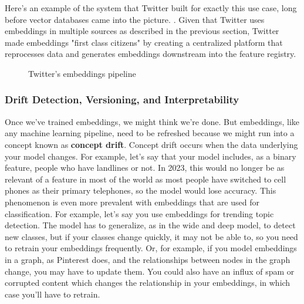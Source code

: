 \documentclass[11pt, table]{diazessay} %
\begin{document}
\begin{sloppypar}
Here's an example of the system that Twitter built for exactly this use case, long before vector databases came into the picture. \citep{shiebler2010making}. Given that Twitter uses embeddings in multiple sources as described in the previous section, Twitter made embeddings "first class citizens" by creating a centralized platform that reprocesses data and generates embeddings downstream into the feature registry.


\begin{figure}[H]
\caption{Twitter's embeddings pipeline\citep{shiebler2010making}}
\end{figure}

\subsubsection{Drift Detection, Versioning, and Interpretability}

Once we've trained embeddings, we might think we're done. But embeddings, like any machine learning pipeline, need to be refreshed because we might run into a concept known as \textbf{concept drift}. Concept drift occurs when the data underlying your model changes. For example, let's say that your model includes, as a binary feature, people who have landlines or not. In 2023, this would no longer be as relevant of a feature in most of the world as most people have switched to cell phones as their primary telephones, so the model would lose accuracy. This phenomenon is even more prevalent with embeddings that are used for classification. For example, let's say you use embeddings for trending topic detection. The model has to generalize, as in the wide and deep model, to detect new classes, but if your classes change quickly, it may not be able to, so  you need to retrain your embeddings frequently. Or, for example, if you model embeddings in a graph, as Pinterest does, and the relationships between nodes in the graph change, you may have to update them\citep{wewer2021updating}. You could also have an influx of spam or corrupted content which changes the relationship in your embeddings, in which case you'll have to retrain.


\end{sloppypar}
\end{document}
